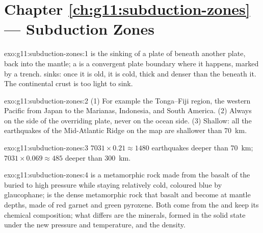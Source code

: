 \section*{Chapter \ref{ch:g11:subduction-zones} --- Subduction Zones}

\begin{solution}{exo:g11:subduction-zones:1}
 is the sinking of a plate of  beneath another
plate, back into the mantle; a  is a convergent plate boundary
where it happens, marked by a trench.  sinks: once it is
old, it is cold, thick and denser than the  beneath it. The
continental crust is too light to sink.
\end{solution}

\begin{solution}{exo:g11:subduction-zones:2}
(1) For example the Tonga--Fiji region, the western Pacific from Japan to the
Marianas, Indonesia, and South America. (2) Always on the side of the
overriding plate, never on the ocean side. (3) Shallow: all the earthquakes of
the Mid-Atlantic Ridge on the map are shallower than \qty{70}{km}.
\end{solution}

\begin{solution}{exo:g11:subduction-zones:3}
$7031 \times 0.21 \approx 1480$ earthquakes deeper than \qty{70}{km};
$7031 \times 0.069 \approx 485$ deeper than \qty{300}{km}.
\end{solution}

\begin{solution}{exo:g11:subduction-zones:4}
 is a metamorphic rock made from the basalt of the 
buried to high pressure while staying relatively cold, coloured blue by
glaucophane;  is the dense metamorphic rock that basalt and 
become at mantle depths, made of red garnet and green pyroxene. Both come from
the  and keep its chemical composition; what differs are the
minerals, formed in the solid state under the new pressure and temperature,
and the density.
\end{solution}

